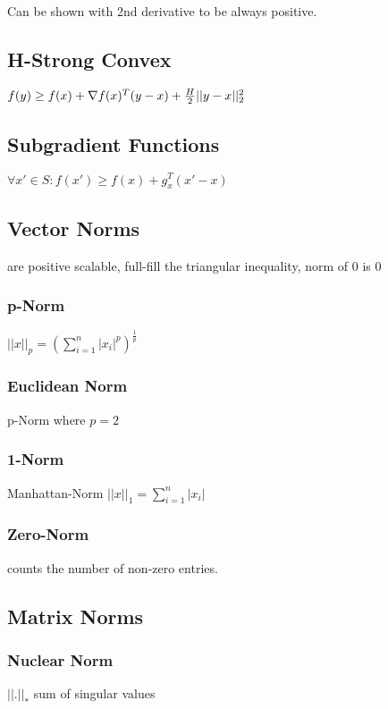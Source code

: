 \documentclass[a4paper,11pt,twocolumn]{article}
\begin{document}
Can be shown with 2nd derivative to be always positive.

\subsection{H-Strong Convex}
$f(y) \geq f(x) + \nabla f(x)^T(y-x) + {H \over 2 } || y - x ||_2^2$

\subsection{Subgradient Functions}
$\forall x' \in S : f(x') \geq f(x) + g_x^T(x'-x)$

\subsection{Vector Norms}
are positive scalable, full-fill the triangular inequality, norm of 0 is 0

\subsubsection{p-Norm}
$ || x ||_p = \left( \sum_{i=1}^{n}{|x_i|^p} \right)^{\frac{1}{p}}$

\subsubsection{Euclidean Norm} 
p-Norm where $p=2$

\subsubsection{1-Norm}
Manhattan-Norm
$ ||x||_1 = \sum_{i=1}^{n}{|x_i|} $

\subsubsection{Zero-Norm} 
counts the number of non-zero entries.

\subsection{Matrix Norms}

\subsubsection{Nuclear Norm}

$|| . ||_*$ sum of singular values
\end{document}
